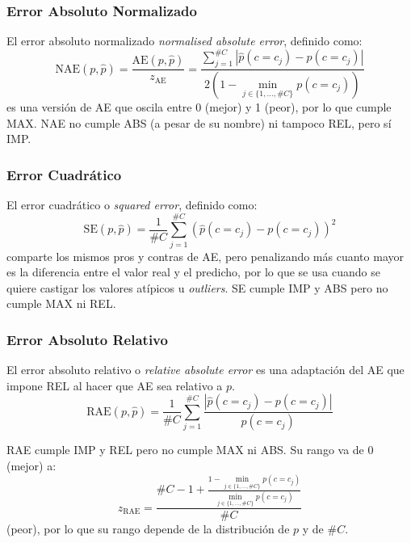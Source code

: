 \subsubsection{Error Absoluto Normalizado}\label{evaluacion:nae}

El error absoluto normalizado {\it normalised absolute error}, definido como:
\begin{equation}
    {\text{NAE}(p, \hat p)} = \frac{\text{AE}(p, \hat p)}{z_{\text{AE}}} = \frac{\sum \limits_{j=1}^{\#C}{|\hat p(c=c_j) - p(c=c_j)|}}{2(1-\displaystyle \min_{j\in\{1,\dots,\#C\}}p(c=c_j))}\label{evaluacion:eq_nae}
\end{equation}
es una versión de AE que oscila entre 0 (mejor) y 1 (peor), por lo que cumple
MAX. NAE no cumple ABS (a pesar de su nombre) ni tampoco REL, pero sí IMP.

\subsubsection{Error Cuadrático}\label{evaluacion:se}

El error cuadrático o {\it squared error}, definido como:
\begin{equation}
    {\text{SE}(p, \hat p)} = \frac{1}{\#C}\sum \limits_{j=1}^{\#C}{{(\hat p(c=c_j) - p(c=c_j))}^2}\label{evaluacion:eq_se}
\end{equation}
comparte los mismos pros y contras de AE, pero penalizando más cuanto mayor es
la diferencia entre el valor real y el predicho, por lo que se usa cuando se
quiere castigar los valores atípicos u {\it outliers}. SE cumple IMP y ABS pero
no cumple MAX ni REL.

\subsubsection{Error Absoluto Relativo}\label{evaluacion:rae}

El error absoluto relativo o {\it relative absolute error\/} es una adaptación
del AE que impone REL al hacer que AE sea relativo a $p$.
\begin{equation}
    {\text{RAE}(p, \hat p)} = \frac{1}{\#C}\sum \limits_{j=1}^{\#C}{\frac{|\hat p(c=c_j) - p(c=c_j)|}{p(c=c_j)}}\label{evaluacion:eq_rae}
\end{equation}

RAE cumple IMP y REL pero no cumple MAX ni ABS. Su rango va de 0 (mejor) a:
\begin{equation}
    z_{\text{RAE}} = \frac{\#C - 1 + \frac {1 - \displaystyle \min_{j\in\{1,\dots,\#C\}}p(c=c_j)}{\displaystyle \min_{j\in\{1,\dots,\#C\}}p(c=c_j)}}{\#C}\label{evaluacion:eq_zrae}
\end{equation}
(peor), por lo que su rango depende de la distribución de $p$ y de $\#C$.

